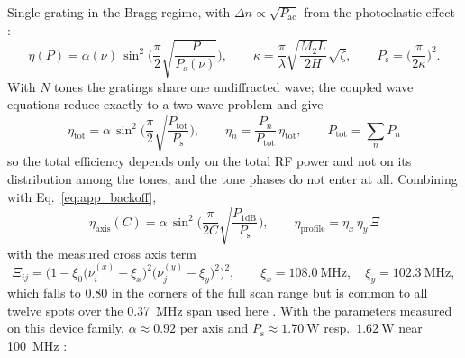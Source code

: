 Single grating in the Bragg regime, with
$\Delta n\propto\sqrt{P_\mathrm{ac}}$ from the photoelastic effect
\cite{Korpel1981,SalehTeich2019,AAOptoTheory}:
\begin{equation}
\eta(P)=\alpha(\nu)\,
\sin^2\!\bigg(\frac{\pi}{2}\sqrt{\frac{P}{P_\mathrm{s}(\nu)}}\bigg),
\qquad
\kappa=\frac{\pi}{\lambda}\sqrt{\frac{M_2L}{2H}}\sqrt{\zeta},
\qquad
P_\mathrm{s}=\Big(\frac{\pi}{2\kappa}\Big)^{2} .
\label{eq:app_etasingle}
\end{equation}
With $N$ tones the gratings share one undiffracted wave; the coupled wave
equations \cite{Kogelnik1969,Laude2003} reduce exactly to a two wave problem
and give \cite{msc:mittenbuehler,Antonov2007}
\begin{equation}
\boxed{\;
\eta_\mathrm{tot}=\alpha\,
\sin^2\!\bigg(\frac{\pi}{2}\sqrt{\frac{P_\mathrm{tot}}{P_\mathrm{s}}}\bigg),
\qquad
\eta_n=\frac{P_n}{P_\mathrm{tot}}\,\eta_\mathrm{tot},
\qquad
P_\mathrm{tot}=\sum_n P_n \;}
\label{eq:app_multitone}
\end{equation}
so the total efficiency depends only on the total RF power and not on its
distribution among the tones, and the tone phases do not enter at all.
Combining with Eq.~\eqref{eq:app_backoff},
\begin{equation}
\boxed{\;
\eta_\mathrm{axis}(C)=\alpha\,
\sin^2\!\bigg(\frac{\pi}{2C}\sqrt{\frac{P_\mathrm{1dB}}{P_\mathrm{s}}}\bigg),
\qquad
\eta_\mathrm{profile}=\eta_x\,\eta_y\,\Xi \;}
\label{eq:app_etacrest}
\end{equation}
with the measured cross axis term
\begin{equation}
\Xi_{ij}=\Big(1-\xi_0\big(\nu^{(x)}_i-\xi_x\big)^2
\big(\nu^{(y)}_j-\xi_y\big)^2\Big)^{2},
\qquad
\xi_x=\SI{108.0}{\mega \hertz},
\quad
\xi_y=\SI{102.3}{\mega \hertz},
\label{eq:app_xi}
\end{equation}
which falls to $0.80$ in the corners of the full scan range but is common to
all twelve spots over the \SI{0.37}{\mega \hertz} span used here
\cite{msc:mittenbuehler}. With the parameters measured on this device family,
$\alpha\approx0.92$ per axis and
$P_\mathrm{s}\approx\SI{1.70}{\watt}$ resp.\ $\SI{1.62}{\watt}$ near
\SI{100}{\mega \hertz} \cite{msc:mittenbuehler}:

